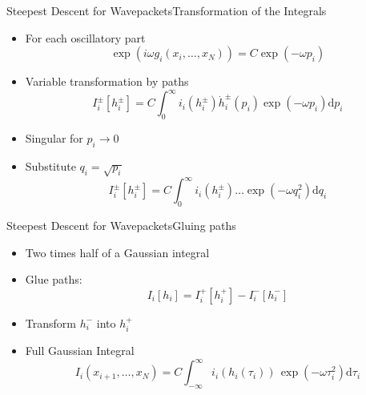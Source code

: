 \documentclass{beamer}
\begin{document}
\begin{frame}{Steepest Descent for Wavepackets}{Transformation of the Integrals}
  \begin{itemize}
    \item For each oscillatory part
    \begin{equation*}
      \exp\left(i\omega g_i\left(x_i,\ldots,x_N\right)\right)
      =
      C
      \exp\left(- \omega p_i\right)
    \end{equation*}
    \item Variable transformation by paths
    \begin{equation*}
        I_i^{\pm}[h_i^{\pm}] =
        C
        \int_0^\infty
          i_i\left(h_i^{\pm}\right)
          \dot{h}_i^{\pm}\left(p_i\right)
          \exp\left(- \omega p_i\right)
        \mathrm{d}p_i
    \end{equation*}
    \item Singular for $p_i \rightarrow 0$
    \item Substitute $q_i = \sqrt{p_i}$
    \begin{equation*}
        I_i^{\pm}[h_i^{\pm}] =
        C
        \int_0^\infty
          i_i\left(h_i^{\pm}\right)
          \ldots
          \exp\left(- \omega q_i^2\right)
        \mathrm{d}q_i
    \end{equation*}
  \end{itemize}
\end{frame}


\begin{frame}{Steepest Descent for Wavepackets}{Gluing paths}
  \begin{itemize}
    \item Two times half of a Gaussian integral
    \item Glue paths:
    \begin{equation*}
      I_i[h_i] =
      I_i^{+}[h_i^{+}]
      -
      I_i^{-}[h_i^{-}]
    \end{equation*}
    \item Transform $h_i^{-}$ into $h_i^{+}$
    \item Full Gaussian Integral
    \begin{equation*}
      I_i\left(x_{i+1},\ldots,x_N\right) =
      C
      \int_{-\infty}^\infty
        i_i\left(h_i\left(\tau_i\right)\right) \,
        \exp\left(- \omega \tau_i^2\right)
      \mathrm{d}\tau_i
    \end{equation*}
  \end{itemize}
\end{frame}
\end{document}
